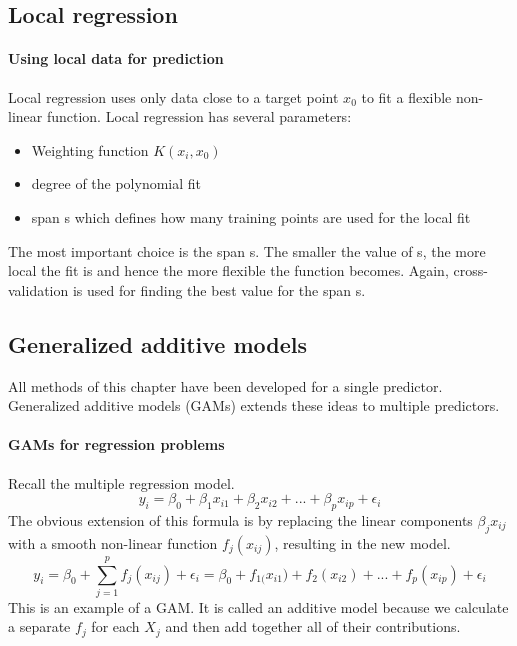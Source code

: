 \documentclass[../document.tex]{subfiles}
\begin{document}
	\subsection{Local regression}

	\paragraph{Using local data for prediction}
	Local regression uses only data close to a target point \(x_{0}\) to fit a flexible non-linear function. Local regression has several parameters:
	\begin{itemize}
		\item Weighting function \(K(x_{i},x_{0})\)
		\item degree of the polynomial fit
		\item span s which defines how many training points are used for the local fit
	\end{itemize}
	The most important choice is the span s. The smaller the value of s, the more local the fit is and hence the more flexible the function becomes. Again, cross-validation is used for finding the best value for the span s.

	\subsection{Generalized additive models}
	All methods of this chapter have been developed for a single predictor. Generalized additive models (GAMs) extends these ideas to multiple predictors.

	\paragraph{GAMs for regression problems}
	Recall the multiple regression model.
	\begin{equation}
		y_{i}=\beta_{0}+\beta_{1}x_{i1}+\beta_{2}x_{i2}+...+\beta_{p}x_{ip}+\epsilon_{i}
	\end{equation}
	The obvious extension of this formula is by replacing the linear components \(\beta_{j}x_{ij}\) with a smooth non-linear function \(f_{j}(x_{ij})\), resulting in the new model.
	\begin{equation}
		y_{i}=\beta_{0}+\sum_{j=1}^{p}f_{j}(x_{ij})+\epsilon_{i} = \beta_{0}+f_{1(}x_{i1})+f_{2}(x_{i2})+...+f_{p}(x_{ip})+\epsilon_{i}
	\end{equation}
	This is an example of a GAM. It is called an additive model because we calculate a separate \(f_{j}\) for each \(X_{j}\) and then add together all of their contributions.
\end{document}
